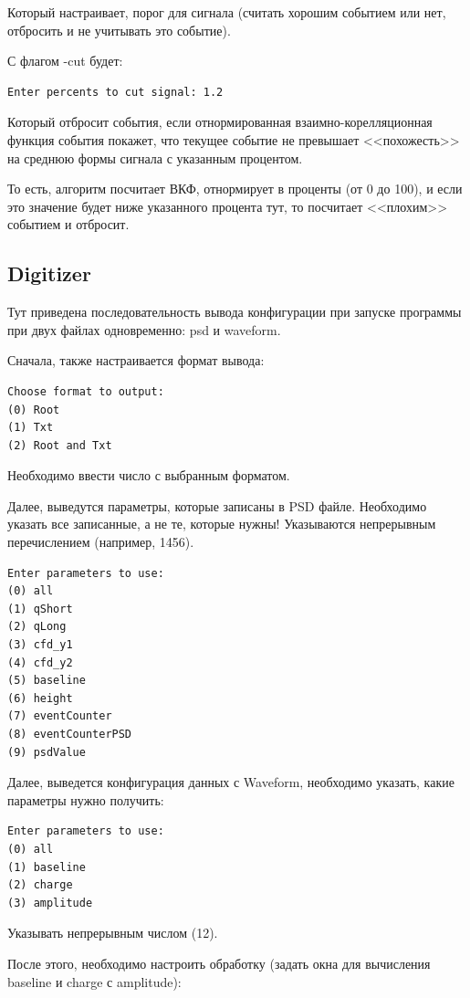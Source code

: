 \documentclass[12pt,a4paper,openany]{article}
\begin{document}
Который настраивает, порог для сигнала (считать хорошим событием или нет, отбросить и не учитывать это событие).

С флагом -cut будет:
\begin{lstlisting}
Enter percents to cut signal: 1.2
\end{lstlisting}

Который отбросит события, если отнормированная взаимно-корелляционная функция события покажет, что текущее событие не превышает <<похожесть>> на среднюю формы сигнала с указанным процентом.

То есть, алгоритм посчитает ВКФ, отнормирует в проценты (от 0 до 100), и если это значение будет ниже указанного процента тут, то посчитает <<плохим>> событием и отбросит.

\subsection{Digitizer}
Тут приведена последовательность вывода конфигурации при запуске программы при двух файлах одновременно: psd и waveform.

Сначала, также настраивается формат вывода:
\begin{lstlisting}
Choose format to output:
(0) Root
(1) Txt
(2) Root and Txt
\end{lstlisting}

Необходимо ввести число с выбранным форматом.

Далее, выведутся параметры, которые записаны в PSD файле. 
Необходимо указать все записанные, а не те, которые нужны!
Указываются непрерывным перечислением (например, 1456).

\begin{lstlisting}
Enter parameters to use:
(0) all
(1) qShort
(2) qLong
(3) cfd_y1
(4) cfd_y2
(5) baseline
(6) height
(7) eventCounter
(8) eventCounterPSD
(9) psdValue
\end{lstlisting}

Далее, выведется конфигурация данных с Waveform, необходимо указать, 
какие параметры нужно получить:

\begin{lstlisting}
Enter parameters to use:
(0) all
(1) baseline
(2) charge
(3) amplitude
\end{lstlisting}

Указывать непрерывным числом (12).

После этого, необходимо настроить обработку (задать окна для вычисления baseline и charge с amplitude):
\end{document}
